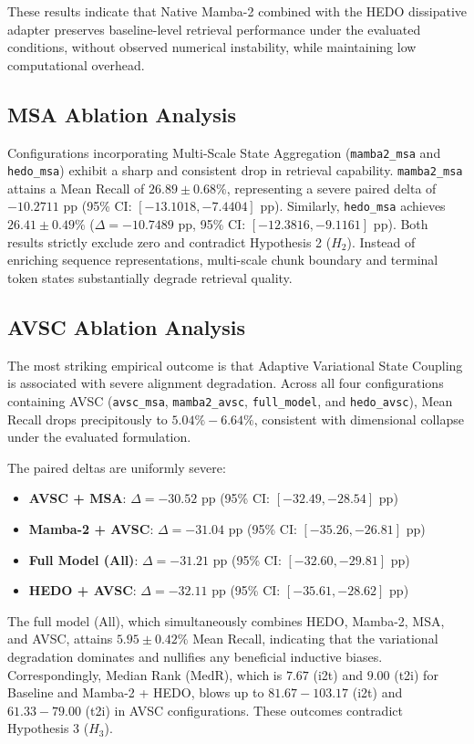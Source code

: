 \documentclass[conference]{IEEEtran}
\begin{document}
These results indicate that Native Mamba-2 combined with the HEDO dissipative adapter preserves baseline-level retrieval performance under the evaluated conditions, without observed numerical instability, while maintaining low computational overhead.

\subsection{MSA Ablation Analysis}
Configurations incorporating Multi-Scale State Aggregation (\texttt{mamba2\_msa} and \texttt{hedo\_msa}) exhibit a sharp and consistent drop in retrieval capability. \texttt{mamba2\_msa} attains a Mean Recall of $26.89 \pm 0.68\%$, representing a severe paired delta of $-10.2711$ pp (95\% CI: $[-13.1018, -7.4404]$ pp). Similarly, \texttt{hedo\_msa} achieves $26.41 \pm 0.49\%$ ($\Delta = -10.7489$ pp, 95\% CI: $[-12.3816, -9.1161]$ pp). Both results strictly exclude zero and contradict Hypothesis 2 ($H_2$). Instead of enriching sequence representations, multi-scale chunk boundary and terminal token states substantially degrade retrieval quality.

\subsection{AVSC Ablation Analysis}
The most striking empirical outcome is that Adaptive Variational State Coupling is associated with severe alignment degradation. Across all four configurations containing AVSC (\texttt{avsc\_msa}, \texttt{mamba2\_avsc}, \texttt{full\_model}, and \texttt{hedo\_avsc}), Mean Recall drops precipitously to $5.04\%-6.64\%$, consistent with dimensional collapse under the evaluated formulation. 

The paired deltas are uniformly severe:
\begin{itemize}
    \item \textbf{AVSC + MSA}: $\Delta = -30.52$ pp (95\% CI: $[-32.49, -28.54]$ pp)
    \item \textbf{Mamba-2 + AVSC}: $\Delta = -31.04$ pp (95\% CI: $[-35.26, -26.81]$ pp)
    \item \textbf{Full Model (All)}: $\Delta = -31.21$ pp (95\% CI: $[-32.60, -29.81]$ pp)
    \item \textbf{HEDO + AVSC}: $\Delta = -32.11$ pp (95\% CI: $[-35.61, -28.62]$ pp)
\end{itemize}
The full model (All), which simultaneously combines HEDO, Mamba-2, MSA, and AVSC, attains $5.95 \pm 0.42\%$ Mean Recall, indicating that the variational degradation dominates and nullifies any beneficial inductive biases. Correspondingly, Median Rank (MedR), which is $7.67$ (i2t) and $9.00$ (t2i) for Baseline and Mamba-2 + HEDO, blows up to $81.67-103.17$ (i2t) and $61.33-79.00$ (t2i) in AVSC configurations. These outcomes contradict Hypothesis 3 ($H_3$).
\end{document}

